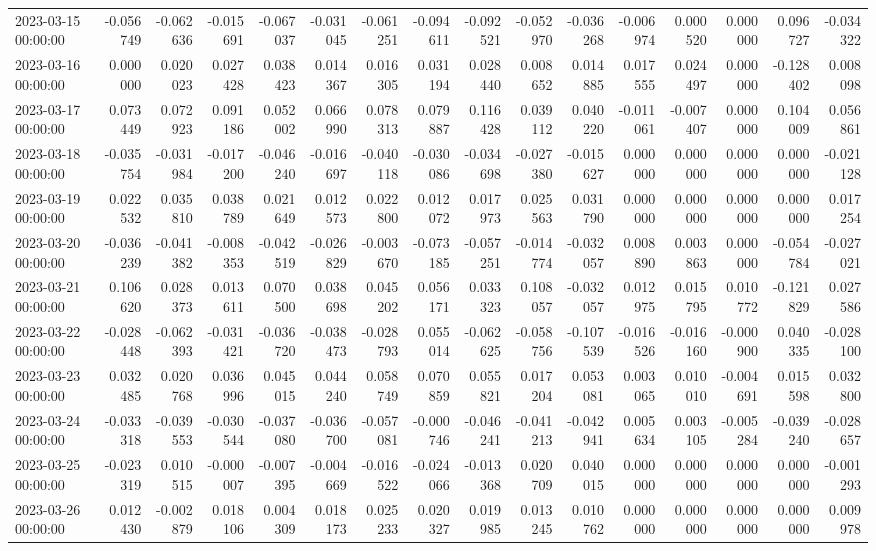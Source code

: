 \begin{tabular}{lrrrrrrrrrrrrrrr}
2023-03-15 00:00:00 & -0.056749 & -0.062636 & -0.015691 & -0.067037 & -0.031045 & -0.061251 & -0.094611 & -0.092521 & -0.052970 & -0.036268 & -0.006974 & 0.000520 & 0.000000 & 0.096727 & -0.034322 \\
2023-03-16 00:00:00 & 0.000000 & 0.020023 & 0.027428 & 0.038423 & 0.014367 & 0.016305 & 0.031194 & 0.028440 & 0.008652 & 0.014885 & 0.017555 & 0.024497 & 0.000000 & -0.128402 & 0.008098 \\
2023-03-17 00:00:00 & 0.073449 & 0.072923 & 0.091186 & 0.052002 & 0.066990 & 0.078313 & 0.079887 & 0.116428 & 0.039112 & 0.040220 & -0.011061 & -0.007407 & 0.000000 & 0.104009 & 0.056861 \\
2023-03-18 00:00:00 & -0.035754 & -0.031984 & -0.017200 & -0.046240 & -0.016697 & -0.040118 & -0.030086 & -0.034698 & -0.027380 & -0.015627 & 0.000000 & 0.000000 & 0.000000 & 0.000000 & -0.021128 \\
2023-03-19 00:00:00 & 0.022532 & 0.035810 & 0.038789 & 0.021649 & 0.012573 & 0.022800 & 0.012072 & 0.017973 & 0.025563 & 0.031790 & 0.000000 & 0.000000 & 0.000000 & 0.000000 & 0.017254 \\
2023-03-20 00:00:00 & -0.036239 & -0.041382 & -0.008353 & -0.042519 & -0.026829 & -0.003670 & -0.073185 & -0.057251 & -0.014774 & -0.032057 & 0.008890 & 0.003863 & 0.000000 & -0.054784 & -0.027021 \\
2023-03-21 00:00:00 & 0.106620 & 0.028373 & 0.013611 & 0.070500 & 0.038698 & 0.045202 & 0.056171 & 0.033323 & 0.108057 & -0.032057 & 0.012975 & 0.015795 & 0.010772 & -0.121829 & 0.027586 \\
2023-03-22 00:00:00 & -0.028448 & -0.062393 & -0.031421 & -0.036720 & -0.038473 & -0.028793 & 0.055014 & -0.062625 & -0.058756 & -0.107539 & -0.016526 & -0.016160 & -0.000900 & 0.040335 & -0.028100 \\
2023-03-23 00:00:00 & 0.032485 & 0.020768 & 0.036996 & 0.045015 & 0.044240 & 0.058749 & 0.070859 & 0.055821 & 0.017204 & 0.053081 & 0.003065 & 0.010010 & -0.004691 & 0.015598 & 0.032800 \\
2023-03-24 00:00:00 & -0.033318 & -0.039553 & -0.030544 & -0.037080 & -0.036700 & -0.057081 & -0.000746 & -0.046241 & -0.041213 & -0.042941 & 0.005634 & 0.003105 & -0.005284 & -0.039240 & -0.028657 \\
2023-03-25 00:00:00 & -0.023319 & 0.010515 & -0.000007 & -0.007395 & -0.004669 & -0.016522 & -0.024066 & -0.013368 & 0.020709 & 0.040015 & 0.000000 & 0.000000 & 0.000000 & 0.000000 & -0.001293 \\
2023-03-26 00:00:00 & 0.012430 & -0.002879 & 0.018106 & 0.004309 & 0.018173 & 0.025233 & 0.020327 & 0.019985 & 0.013245 & 0.010762 & 0.000000 & 0.000000 & 0.000000 & 0.000000 & 0.009978 \\

\end{tabular}
